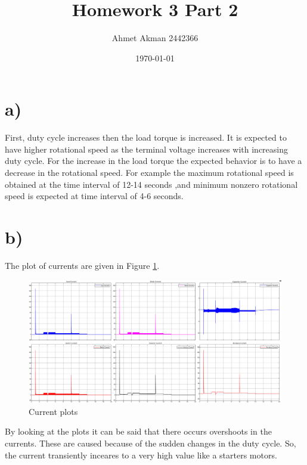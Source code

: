 \documentclass[letterpaper,12pt]{article}
\begin{document}
\title{Homework 3 Part 2 }
\author{Ahmet Akman 2442366 }
\date{\today}
\maketitle
\section{a)}
First, duty cycle increases then the load torque is increased. It is expected to have higher rotational speed as the terminal voltage increases with increasing duty cycle. For the increase in the load torque the expected behavior is to have a decrease in the rotational speed. For example the maximum rotational speed is obtained at the time interval of 12-14 seconds ,and minimum nonzero rotational speed is expected at time interval of 4-6 seconds. 
\section{b)}
The plot of currents are given in Figure \ref{currents}.

\begin{figure}[H]
    \centering
    \includegraphics[width=1\textwidth]{case1_1.png}
    \caption{Current plots}
    \label{currents}
\end{figure} 
By looking at the plots it can be said that there occurs overshoots in the currents. These are caused because of the sudden changes in the duty cycle. So, the current transiently inceares to a very high value like a starters motors.
\end{document}
